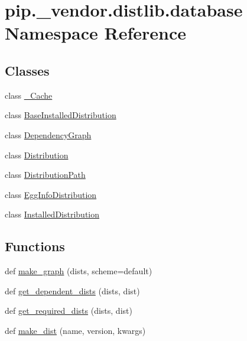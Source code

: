 \hypertarget{namespacepip_1_1__vendor_1_1distlib_1_1database}{}\section{pip.\+\_\+vendor.\+distlib.\+database Namespace Reference}
\label{namespacepip_1_1__vendor_1_1distlib_1_1database}
\subsection*{Classes}
\begin{DoxyCompactItemize}
\item 
class \hyperlink{classpip_1_1__vendor_1_1distlib_1_1database_1_1__Cache}{\+\_\+\+Cache}
\item 
class \hyperlink{classpip_1_1__vendor_1_1distlib_1_1database_1_1BaseInstalledDistribution}{Base\+Installed\+Distribution}
\item 
class \hyperlink{classpip_1_1__vendor_1_1distlib_1_1database_1_1DependencyGraph}{Dependency\+Graph}
\item 
class \hyperlink{classpip_1_1__vendor_1_1distlib_1_1database_1_1Distribution}{Distribution}
\item 
class \hyperlink{classpip_1_1__vendor_1_1distlib_1_1database_1_1DistributionPath}{Distribution\+Path}
\item 
class \hyperlink{classpip_1_1__vendor_1_1distlib_1_1database_1_1EggInfoDistribution}{Egg\+Info\+Distribution}
\item 
class \hyperlink{classpip_1_1__vendor_1_1distlib_1_1database_1_1InstalledDistribution}{Installed\+Distribution}
\end{DoxyCompactItemize}
\subsection*{Functions}
\begin{DoxyCompactItemize}
\item 
def \hyperlink{namespacepip_1_1__vendor_1_1distlib_1_1database_ad5cd1646c2526fe39bb39eb0c87da7b9}{make\+\_\+graph} (dists, scheme=\textquotesingle{}default\textquotesingle{})
\item 
def \hyperlink{namespacepip_1_1__vendor_1_1distlib_1_1database_a8f519f4fa277d7754db81c4e7310c96f}{get\+\_\+dependent\+\_\+dists} (dists, dist)
\item 
def \hyperlink{namespacepip_1_1__vendor_1_1distlib_1_1database_a56612672fda608b5d09d6fe736c1270c}{get\+\_\+required\+\_\+dists} (dists, dist)
\item 
def \hyperlink{namespacepip_1_1__vendor_1_1distlib_1_1database_ae4d947316c0bd48b1cf8de07d4bc5665}{make\+\_\+dist} (name, version, kwargs)
\end{DoxyCompactItemize}
